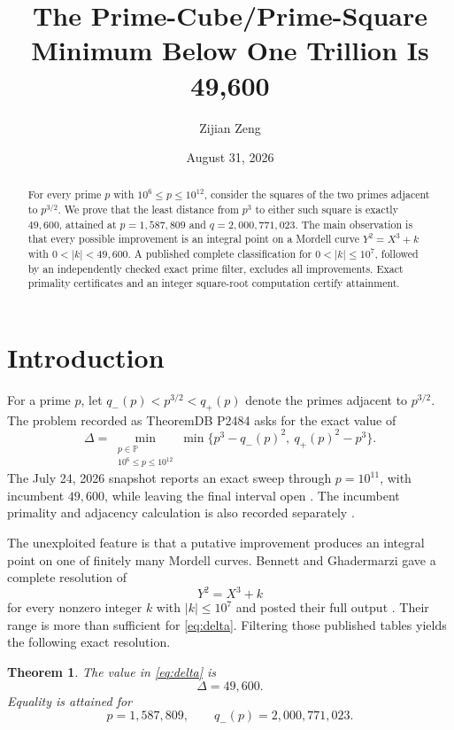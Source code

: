 \documentclass[11pt]{amsart}
\title{The Prime-Cube/Prime-Square Minimum Below One Trillion Is 49,600}
\author{Zijian Zeng}
\date{August 31, 2026}
\newtheorem{theorem}{Theorem}[section]
\theoremstyle{remark}
\newcommand{\PP}{\mathbb P}
\begin{document}
\begin{abstract}
For every prime $p$ with $10^6\le p\le10^{12}$, consider the squares of the
two primes adjacent to $p^{3/2}$.  We prove that the least distance from
$p^3$ to either such square is exactly $49{,}600$, attained at
$p=1{,}587{,}809$ and $q=2{,}000{,}771{,}023$.  The main observation is that
every possible improvement is an integral point on a Mordell curve
$Y^2=X^3+k$ with $0<|k|<49{,}600$.  A published complete classification for
$0<|k|\le10^7$, followed by an independently checked exact prime filter,
excludes all improvements.  Exact primality certificates and an integer
square-root computation certify attainment.
\end{abstract}

\maketitle

\section{Introduction}

For a prime $p$, let $q_-(p)<p^{3/2}<q_+(p)$ denote the primes adjacent to
$p^{3/2}$.  The problem recorded as TheoremDB P2484 asks for the exact value
of
\begin{equation}\label{eq:delta}
 \Delta=\min_{\substack{p\in\PP\\10^6\le p\le10^{12}}}
 \min\{p^3-q_-(p)^2,\ q_+(p)^2-p^3\}.
\end{equation}
The July 24, 2026 snapshot reports an exact sweep through $p=10^{11}$, with
incumbent $49{,}600$, while leaving the final interval open
\cite{TheoremDBP2484}.  The incumbent primality and adjacency calculation is
also recorded separately \cite{TheoremDBR560}.

The unexploited feature is that a putative improvement produces an integral
point on one of finitely many Mordell curves.  Bennett and Ghadermarzi gave a
complete resolution of
\begin{equation}\label{eq:mordell}
 Y^2=X^3+k
\end{equation}
for every nonzero integer $k$ with $|k|\le10^7$ and posted their full output
\cite{BennettGhadermarzi2015}.  Their range is more than sufficient for
\eqref{eq:delta}.  Filtering those published tables yields the following
exact resolution.

\begin{theorem}\label{thm:main}
The value in \eqref{eq:delta} is
\[
 \Delta=49{,}600.
\]
Equality is attained for
\[
 p=1{,}587{,}809,\qquad q_-(p)=2{,}000{,}771{,}023.
\]
\end{theorem}
\end{document}
